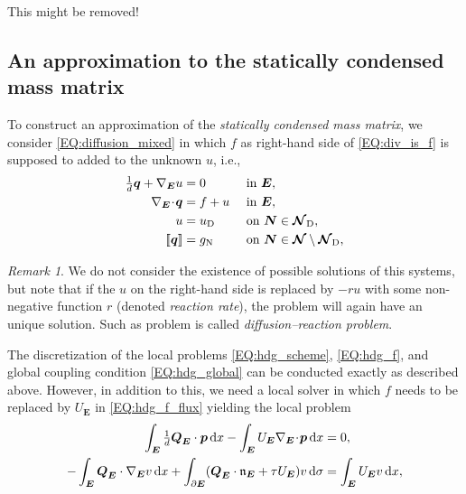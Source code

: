 \documentclass[a4paper, english, 12pt, reqno, draft]{amsart}
\theoremstyle{definition}
\theoremstyle{remark}
\newtheorem{remark}[theorem]{Remark}
\numberwithin{equation}{section}
\newcommand{\SetNode}{\ensuremath{\boldsymbol{\mathcal N}}}
\newcommand{\SetNodeDir}{\ensuremath{\SetNode_\textup D}}
\newcommand{\Edge}{{\ensuremath{\boldsymbol E}}}
\newcommand{\Node}{{\ensuremath{\boldsymbol N}}}
\newcommand{\Nabla}{\ensuremath{\nabla_\Edge}}
\newcommand{\Div}{\ensuremath{\Nabla\!\cdot\!}}
\newcommand{\Normal}{\ensuremath{\mathfrak n_\Edge}}
\newcommand{\jump}[1]{{[\![ #1 ]\!]}}
\renewcommand{\vec}[1]{\ensuremath{\boldsymbol{#1}}}
\newcommand{\dx}{\ensuremath{\, \textup d x}}
\newcommand{\ds}{\ensuremath{\, \textup d \sigma}}
\begin{document}
\begin{envarfatal}{This might be removed!}
% 
\subsection{An approximation to the statically condensed mass matrix}\label{SEC:approx_mass}
% 
To construct an approximation of the \emph{statically condensed mass matrix}, we consider \eqref{EQ:diffusion_mixed} in which $f$ as right-hand side of \eqref{EQ:div_is_f} is supposed to added to the unknown $u$, i.e.,
% 
\begin{subequations}\label{EQ:diffusion_fu_mixed}
\begin{align}
 \tfrac{1}{d} \vec q + \Nabla u & = 0 && \text{ in } \Edge,\label{EQ:primal_dual_fu}\\
 \Div \vec q & = f + u && \text{ in } \Edge,\label{EQ:div_is_u}\\
  u & = u_\textup D && \text{ on } \Node \in \SetNodeDir,\label{EQ:dir_cond_fu}\\
 \jump{\vec q} & = g_\textup N && \text{ on } \Node \in \SetNode \setminus \SetNodeDir,\label{EQ:neu_cond_fu}
\end{align}
\end{subequations}
% 
\begin{remark}\label{REM:ex_reaction}
 We do not consider the existence of possible solutions of this systems, but note that if the $u$ on the right-hand side is replaced by $- ru$ with some non-negative function $r$ (denoted \emph{reaction rate}), the problem will again have an unique solution. Such as problem is called \emph{diffusion--reaction problem}.
\end{remark}
% 
The discretization of the local problems \eqref{EQ:hdg_scheme}, \eqref{EQ:hdg_f}, and global coupling condition \eqref{EQ:hdg_global} can be conducted exactly as described above. However, in addition to this, we need a local solver in which $f$ needs to be replaced by $U_\Edge$ in \eqref{EQ:hdg_f_flux} yielding the local problem
% 
\begin{subequations}\label{EQ:hdg_f_is_u}
 \begin{align}
  \int_\Edge \tfrac{1}{d} \vec Q_\Edge \cdot \vec p \dx - \int_\Edge U_\Edge \Div \vec p \dx & = 0, \label{EQ:hdg_fu_primary}\\
  - \int_\Edge \vec Q_\Edge \cdot \Nabla v \dx  + \int_{\partial \Edge} ( \vec Q_\Edge \cdot \Normal + \tau U_\Edge ) v \ds & =  \int_{\Edge} U_\Edge v \dx,\label{EQ:hdg_fu_flux}
 \end{align}

\end{subequations}
\end{envarfatal}
\end{document}
